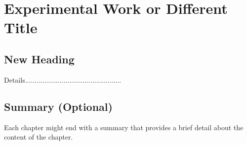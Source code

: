 \chapter{Experimental Work or Different Title}

    


\section{New Heading}
\begin{justify}
    Details..................................................
\end{justify}


\section{Summary (Optional)}
\begin{justify}
    Each chapter might end with a summary that provides a brief detail about the content of the chapter.
\end{justify}


\clearpage